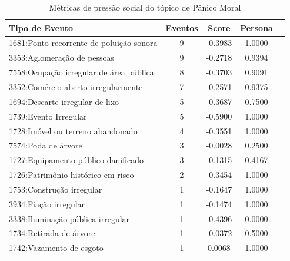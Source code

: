 \begin{table}[htbp]
	\centering
	\caption{Métricas de pressão social do tópico de Pânico Moral}
	\label{tab:eventos_populares_moral_panic}
	\begin{tabular}{|l|c|c|c|c|}
		\hline
		\textbf{Tipo de Evento}                    & \textbf{Eventos} & \textbf{Score} & \textbf{Persona} \\
		\hline
		1681:Ponto recorrente de poluição sonora   & 9                & -0.3983        & 1.0000           \\
		\hline
		3353:Aglomeração de pessoas                & 9                & -0.2718        & 0.9394           \\
		\hline
		7558:Ocupação irregular de área pública    & 8                & -0.3703        & 0.9091           \\
		\hline
		3352:Comércio aberto irregularmente        & 7                & -0.2571        & 0.9375           \\
		\hline
		1694:Descarte irregular de lixo            & 5                & -0.3687        & 0.7500           \\
		\hline
		1739:Evento Irregular                      & 5                & -0.5900        & 1.0000           \\
		\hline
		1728:Imóvel ou terreno abandonado          & 4                & -0.3551        & 1.0000           \\
		\hline
		7574:Poda de árvore                        & 3                & -0.0028        & 0.2500           \\
		\hline
		1727:Equipamento público danificado        & 3                & -0.1315        & 0.4167           \\
		\hline
		1726:Patrimônio histórico em risco         & 2                & -0.3454        & 1.0000           \\
		\hline
		1753:Construção irregular                  & 1                & -0.1647        & 1.0000           \\
		\hline
		3934:Fiação irregular                      & 1                & -0.1474        & 1.0000           \\
		\hline
		3338:Iluminação pública irregular          & 1                & -0.4396        & 0.0000           \\
		\hline
		1734:Retirada de árvore                    & 1                & -0.0372        & 0.5000           \\
		\hline
		1742:Vazamento de esgoto                   & 1                & 0.0068         & 1.0000           \\

\end{tabular}
\end{table}
